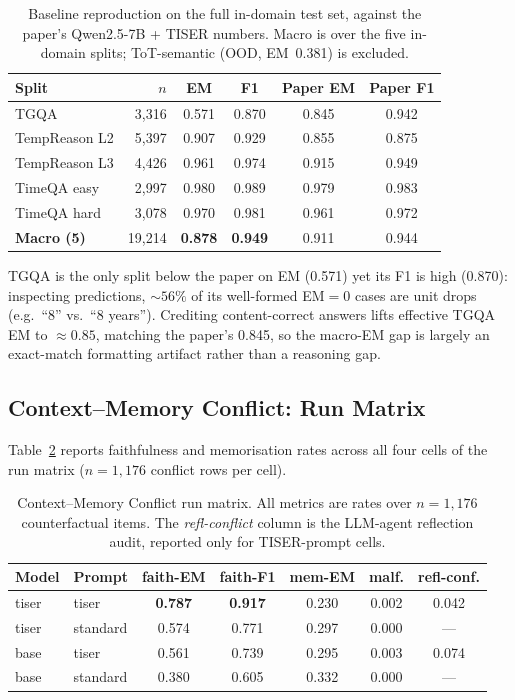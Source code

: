 \documentclass[conference]{IEEEtran}
\begin{document}
\begin{table}[t]
\centering
\caption{Baseline reproduction on the full in-domain test set, against the paper's Qwen2.5-7B + TISER numbers. Macro is over the five in-domain splits; ToT-semantic (OOD, EM~0.381) is excluded.}
\label{tab:baseline}
\setlength{\tabcolsep}{4pt}
{\footnotesize
\begin{tabular}{lrcccc}
\toprule
\textbf{Split} & \textbf{$n$} & \textbf{EM} & \textbf{F1} & \textbf{Paper EM} & \textbf{Paper F1} \\
\midrule
TGQA            & 3{,}316 & 0.571 & 0.870 & 0.845 & 0.942 \\
TempReason L2   & 5{,}397 & 0.907 & 0.929 & 0.855 & 0.875 \\
TempReason L3   & 4{,}426 & 0.961 & 0.974 & 0.915 & 0.949 \\
TimeQA easy     & 2{,}997 & 0.980 & 0.989 & 0.979 & 0.983 \\
TimeQA hard     & 3{,}078 & 0.970 & 0.981 & 0.961 & 0.972 \\
\midrule
\textbf{Macro (5)} & 19{,}214 & \textbf{0.878} & \textbf{0.949} & 0.911 & 0.944 \\
\bottomrule
\end{tabular}
}
\end{table}

TGQA is the only split below the paper on EM (0.571) yet its F1 is high (0.870): inspecting predictions, ${\sim}56\%$ of its well-formed EM$=$0 cases are unit drops (e.g.\ ``8'' vs.\ ``8 years''). Crediting content-correct answers lifts effective TGQA EM to ${\approx}0.85$, matching the paper's 0.845, so the macro-EM gap is largely an exact-match formatting artifact rather than a reasoning gap.

\subsection{Context--Memory Conflict: Run Matrix}

Table~\ref{tab:conflict} reports faithfulness and memorisation rates across all four cells of the run matrix ($n{=}1{,}176$ conflict rows per cell).

\begin{table}[t]
\centering
\caption{Context--Memory Conflict run matrix. All metrics are rates over $n{=}1{,}176$ counterfactual items. The \emph{refl-conflict} column is the LLM-agent reflection audit, reported only for TISER-prompt cells.}
\label{tab:conflict}
\setlength{\tabcolsep}{3pt}
\begin{tabular}{llccccc}
\toprule
\textbf{Model} & \textbf{Prompt} & \textbf{faith-EM} & \textbf{faith-F1} & \textbf{mem-EM} & \textbf{malf.} & \textbf{refl-conf.} \\
\midrule
tiser  & tiser    & \textbf{0.787} & \textbf{0.917} & 0.230 & 0.002 & 0.042 \\
tiser  & standard & 0.574 & 0.771 & 0.297 & 0.000 & ---   \\
base   & tiser    & 0.561 & 0.739 & 0.295 & 0.003 & 0.074 \\
base   & standard & 0.380 & 0.605 & 0.332 & 0.000 & ---   \\
\bottomrule
\end{tabular}
\end{table}
\end{document}
